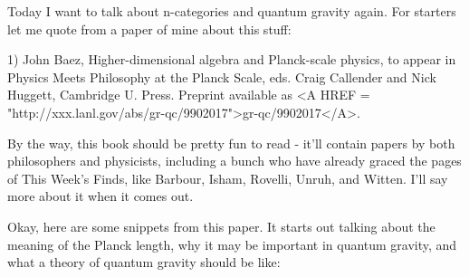 

Today I want to talk about n-categories and quantum gravity again.  For
starters let me quote from a paper of mine about this stuff:

1) John Baez, Higher-dimensional algebra and Planck-scale physics,
to appear in Physics Meets Philosophy at the Planck Scale, eds. 
Craig Callender and Nick Huggett, Cambridge U. Press.  Preprint
available as 
<A HREF = "http://xxx.lanl.gov/abs/gr-qc/9902017">gr-qc/9902017</A>.

By the way, this book should be pretty fun to read - it'll contain papers 
by both philosophers and physicists, including a bunch who have already 
graced the pages of This Week's Finds, like Barbour, Isham, Rovelli, 
Unruh, and Witten.   I'll say more about it when it comes out.

Okay, here are some snippets from this paper.  It starts out talking
about the meaning of the Planck length, why it may be important in 
quantum gravity, and what a theory of quantum gravity should be like:


